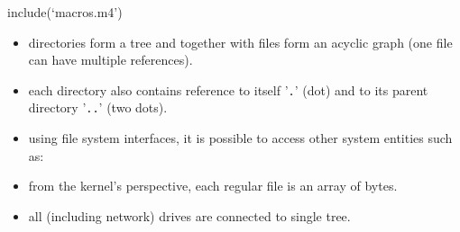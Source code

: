 
include(`macros.m4')



\begin{slide}
\setlength{\baselineskip}{0.8\baselineskip}
\begin{itemize}
\item directories form a tree and together with files form an acyclic graph
(one file can have multiple references).
\item each directory also contains reference to itself '\texttt{.}'
(dot) and to its parent directory '\texttt{..}' (two dots). 
\item using file system interfaces, it is possible to access other system
entities such as:
\item from the kernel's perspective, each regular file is an array of bytes.
\item all (including network) drives are connected to single tree.
\end{itemize}
\end{slide}


